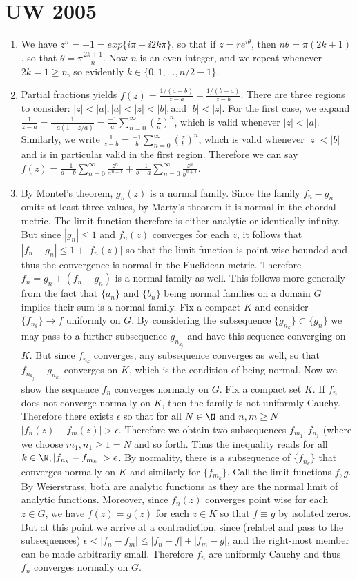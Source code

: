 \documentclass[11pt]{book}
\theoremstyle{definition}
\begin{document}
\section{UW 2005}
\begin{enumerate}
\item We have $z^n=-1=exp\{i\pi+i2k\pi\}$, so that if $z=re^{i\theta}$, then $n\theta=\pi(2k+1)$, so that $\theta=\pi\frac{2k+1}{n}$. Now $n$ is an even integer, and we repeat whenever $2k=1\geq n$, so evidently $k\in\{0,1,\dotsc,n/2-1\}$. 
\item Partial fractions yields $f(z)=\frac{1/(a-b)}{z-a}+\frac{1/(b-a)}{z-b}$. There are three regions to consider: $|z|<|a|, |a|<|z|<|b|, $and $|b|<|z|$. For the first case, we expand $\frac{1}{z-a}=\frac{1}{-a(1-z/a)}=\frac{-1}{a}\sum_{n=0}^\infty (\frac{z}{a})^n$, which is valid whenever $|z|<|a|$. Similarly, we write $\frac{1}{z-b}=\frac{-1}{b}\sum_{n=0}^\infty (\frac{z}{b})^n$, which is valid whenever $|z|<|b|$ and is in particular valid in the first region. Therefore we can say $f(z)=\frac{-1}{a-b}\sum_{n=0}^\infty \frac{z^n}{a^{n+1}} + \frac{-1}{b-a}\sum_{n=0}^\infty \frac{z^n}{b^{n+1}}$.
\item By Montel's theorem, $g_n(z)$ is a normal family. Since the family $f_n-g_n$ omits at least three values, by Marty's theorem it is normal in the chordal metric. The limit function therefore is either analytic or identically infinity. But since $|g_n|\leq1$ and $f_n(z)$ converges for each $z$, it follows that $|f_n-g_n|\leq 1+|f_n(z)|$ so that the limit function is point wise bounded and thus the convergence is normal in the Euclidean metric. Therefore $f_n=g_n+(f_n-g_n)$ is a normal family as well. This follows more generally from the fact that $\{a_n\}$ and $\{b_n\}$ being normal families on a domain $G$ implies their sum is a normal family. Fix a compact $K$ and consider $\{f_{n_k}\}\to f$ uniformly on $G$. By considering the subsequence $\{g_{n_k}\}\subset\{g_n\}$ we may pass to a further subsequence $g_{n_{k_j}}$ and have this sequence converging on $K$. But since $f_{n_k}$ converges, any subsequence converges as well, so that $f_{n_{k_j}}+g_{n_{k_j}}$ converges on $K$, which is the condition of being normal. Now we show the sequence $f_n$ converges normally on $G$. Fix a compact set $K$. If $f_n$ does not converge normally on $K$, then the family is not uniformly Cauchy. Therefore there exists $\epsilon$ so that for all $N\in \N$ and $n,m\geq N$ $|f_n(z)-f_m(z)|>\epsilon$. Therefore we obtain two subsequences $f_{m_1}, f_{n_1}$ (where we choose $m_1,n_1\geq 1=N$ and so forth. Thus the inequality reads for all $k\in \N, |f_{n_k}-f_{m_k}|>\epsilon$. By normality, there is a subsequence of $\{f_{n_k}\}$ that converges normally on $K$ and similarly for $\{f_{m_k}\}$. Call the limit functions $f,g$. By Weierstrass, both are analytic functions as they are the normal limit of analytic functions. Moreover, since $f_n(z)$ converges point wise for each $z\in G$, we have $f(z)=g(z)$ for each $z\in K$ so that $f\equiv g$ by isolated zeros. But at this point we arrive at a contradiction, since (relabel and pass to the subsequences) $\epsilon<|f_n-f_m|\leq |f_n-f|+|f_m-g|$, and the right-most member can be made arbitrarily small. Therefore $f_n$ are uniformly Cauchy and thus $f_n$ converges normally on $G$.

\end{enumerate}
\end{document}
